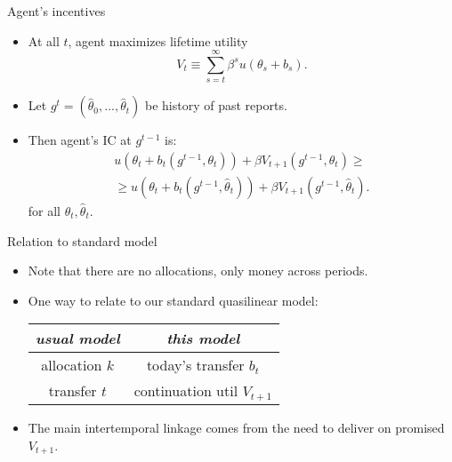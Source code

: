\documentclass[english,10pt
,aspectratio=169
]{beamer}
\begin{document}
\begin{frame}{Agent's incentives}
\begin{itemize}
	\item At all $t$, agent maximizes lifetime utility 
	$$V_t \equiv \sum_{s=t}^\infty \beta^s u(\theta_s + b_s).$$
	\item Let $g^t = (\hat{\theta}_0, ..., \hat{\theta}_t)$ be history of past reports.
	\item Then agent's IC at $g^{t-1}$ is:
	\begin{align*}
		u(\theta_t + b_t(g^{t-1},{\theta}_t)) +\beta V_{t+1}(g^{t-1},{\theta}_t) \geq 
		\\
		\geq u(\theta_t + b_t(g^{t-1},\hat{\theta}_t)) +\beta V_{t+1}(g^{t-1},\hat{\theta}_t).
	\end{align*}
	for all $\theta_t,\hat{\theta}_t$.
\end{itemize}
\end{frame}


\begin{frame}{Relation to standard model}
\begin{itemize}
	\item Note that there are no allocations, only money across periods.
	\item One way to relate to our standard quasilinear model:
	\medskip
	\begin{center}
		\begin{tabular}{| c | c |}
			\hline
			\emph{usual model} 	& \emph{this model} \\ \hline
			allocation $k$ 	& today's transfer $b_t$\\ \hline
			transfer $t$ 	& continuation util $V_{t+1}$\\ \hline
		\end{tabular}
	\end{center}
	\medskip
	\item The main intertemporal linkage comes from the need to deliver on promised $V_{t+1}$.
\end{itemize}
\end{frame}
\end{document}
